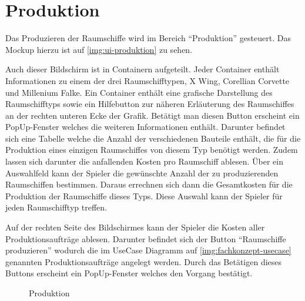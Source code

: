\section{Produktion}
\label{sec:ui-produktion}


Das Produzieren der Raumschiffe wird im Bereich “Produktion” gesteuert. Das Mockup hierzu ist auf \vref{img:ui-produktion} zu sehen. 

Auch dieser Bildschirm ist in Containern aufgeteilt. Jeder Container enthält Informationen zu einem der drei Raumschifftypen, X Wing, Corellian Corvette und Millenium Falke. Ein Container enthält eine grafische Darstellung des Raumschifftyps sowie ein Hilfebutton zur näheren Erläuterung des Raumschiffes an der rechten unteren Ecke der Grafik. Betätigt man diesen Button erscheint ein PopUp-Fenster welches die weiteren Informationen enthält. Darunter befindet sich eine Tabelle welche die Anzahl der verschiedenen Bauteile enthält, die für die Produktion eines einzigen Raumschiffes von diesem Typ benötigt werden. Zudem lassen sich darunter die anfallenden Kosten pro Raumschiff ablesen. Über ein Auswahlfeld kann der Spieler die gewünschte Anzahl der zu produzierenden Raumschiffen bestimmen. Daraus errechnen sich dann die Gesamtkosten für die Produktion der Raumschiffe dieses Typs. Diese Auswahl kann der Spieler für jeden Raumschifftyp treffen.

Auf der rechten Seite des Bildschirmes kann der Spieler die Kosten aller Produktionsaufträge ablesen. Darunter befindet sich der Button “Raumschiffe produzieren” wodurch die im UseCase Diagramm auf \vref{img:fachkonzept-usecase} genannten Produktionsaufträge angelegt werden. Durch das Betätigen dieses Buttons erscheint ein PopUp-Fenster welches den Vorgang bestätigt. 

\begin{figure}[htbp]
  \centering
  \caption{Produktion}
  \label{img:ui-produktion}
\end{figure}

\autorende{}